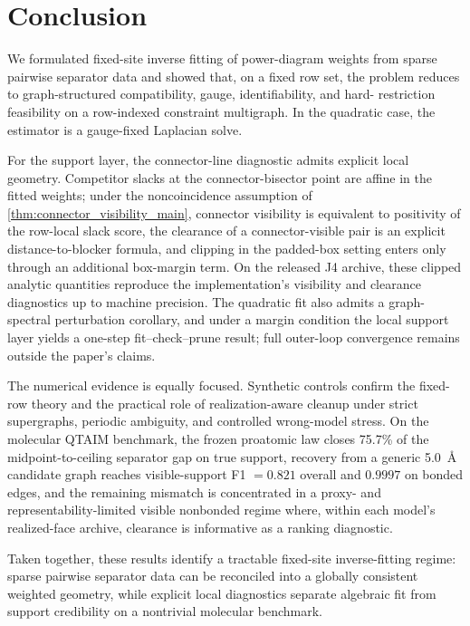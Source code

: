 \documentclass[preprint,12pt]{elsarticle}
\begin{document}
\section{Conclusion}
\label{sec:conclusion}

We formulated fixed-site inverse fitting of power-diagram weights from sparse
pairwise separator data and showed that, on a fixed row set, the problem
reduces to graph-structured compatibility, gauge, identifiability, and hard-
restriction feasibility on a row-indexed constraint multigraph. In the
quadratic case, the estimator is a gauge-fixed Laplacian solve.

For the support layer, the connector-line diagnostic admits explicit local
geometry. Competitor slacks at the connector-bisector point are affine in the
fitted weights; under the noncoincidence assumption of
\cref{thm:connector_visibility_main}, connector visibility is equivalent to
positivity of the row-local slack score, the clearance of a connector-visible
pair is an explicit distance-to-blocker formula, and clipping in the padded-box
setting enters only through an additional box-margin term. On
the released J4 archive, these clipped analytic quantities reproduce the
implementation's visibility and clearance diagnostics up to machine precision.
The quadratic fit also admits a graph-spectral perturbation corollary, and
under a margin condition the local support layer yields a one-step
fit--check--prune result; full outer-loop convergence remains outside the
paper's claims.

The numerical evidence is equally focused. Synthetic controls confirm the
fixed-row theory and the practical role of realization-aware cleanup under
strict supergraphs, periodic ambiguity, and controlled wrong-model stress. On
the molecular QTAIM benchmark, the frozen proatomic law closes 75.7\% of the
midpoint-to-ceiling separator gap on true support, recovery from a generic
5.0~\AA{} candidate graph reaches visible-support F1 $=0.821$ overall and
$0.9997$ on bonded edges, and the remaining mismatch is concentrated in a
proxy- and representability-limited visible nonbonded regime where, within
each model's realized-face archive, clearance is informative as a ranking
diagnostic.

Taken together, these results identify a tractable fixed-site inverse-fitting
regime: sparse pairwise separator data can be reconciled into a globally
consistent weighted geometry, while explicit local diagnostics separate
algebraic fit from support credibility on a nontrivial molecular benchmark.
\end{document}
